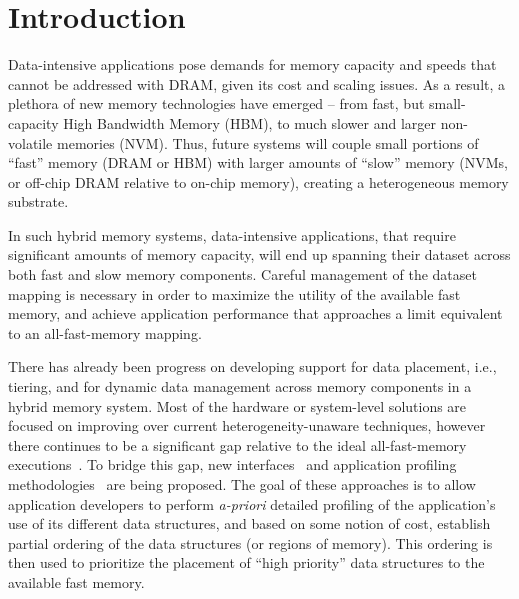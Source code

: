 \section{Introduction}
\label{sec:intro}

Data-intensive applications pose demands for memory capacity and speeds that cannot be addressed with DRAM, given its cost and scaling issues. As a result, a plethora of new memory technologies have emerged -- from fast, but small-capacity High Bandwidth Memory (HBM), to much slower and larger non-volatile memories (NVM). 
Thus, future systems will couple small portions of ``fast'' memory (DRAM or HBM) with larger amounts of ``slow'' memory (NVMs, or off-chip DRAM relative to on-chip memory), creating a heterogeneous memory substrate. 

In such hybrid memory systems, data-intensive applications, that require significant amounts of memory capacity, will end up spanning their dataset across both fast and slow memory components. Careful management of the dataset mapping is necessary in order to maximize the utility of the available fast memory, and achieve application performance that approaches a limit equivalent to an all-fast-memory mapping. 

There has already been progress on developing support for data placement, i.e., tiering, and for dynamic data management across memory components in a hybrid memory system. Most of the hardware or system-level solutions are focused on improving over current heterogeneity-unaware techniques, however there continues to be a significant gap relative to the ideal all-fast-memory executions~\cite{sudarsun:isca17,Chou:Batman}. To bridge this gap, new interfaces~\cite{memkind} and application profiling methodologies~\cite{Dulloor:tiering,Shen:dataplacer,Pena:knapsack} are being proposed. The goal of these approaches is to allow application developers to perform {\em a-priori} detailed profiling of the application's use of its different data structures, and based on some notion of cost, establish partial ordering of the data structures (or regions of memory). This ordering is then used to prioritize the placement of ``high priority'' data structures to the available fast memory. 


